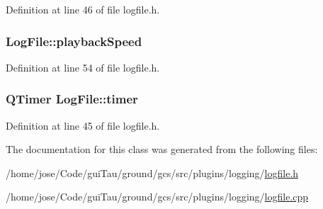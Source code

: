 Definition at line 46 of file logfile.\-h.

\hypertarget{class_log_file_a353850a88290b049a84fc18783a99099}{
\subsubsection[{playback\-Speed}]{ Log\-File\-::playback\-Speed\hspace{0.3cm}{\ttfamily [protected]}}}\label{class_log_file_a353850a88290b049a84fc18783a99099}


Definition at line 54 of file logfile.\-h.

\hypertarget{class_log_file_a0d87ba8e55632876b82a820c895ad549}{
\subsubsection[{timer}]{\setlength{\rightskip}{0pt plus 5cm}Q\-Timer Log\-File\-::timer\hspace{0.3cm}{\ttfamily [protected]}}}\label{class_log_file_a0d87ba8e55632876b82a820c895ad549}


Definition at line 45 of file logfile.\-h.



The documentation for this class was generated from the following files\-:\begin{DoxyCompactItemize}
\item 
/home/jose/\-Code/gui\-Tau/ground/gcs/src/plugins/logging/\hyperlink{logfile_8h}{logfile.\-h}\item 
/home/jose/\-Code/gui\-Tau/ground/gcs/src/plugins/logging/\hyperlink{logfile_8cpp}{logfile.\-cpp}\end{DoxyCompactItemize}
